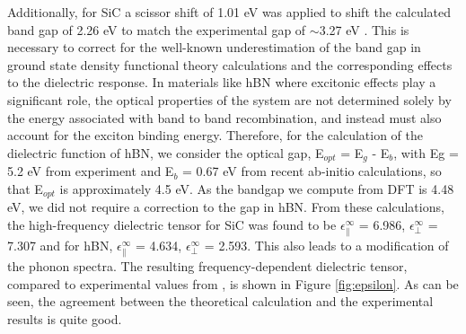 \documentclass[superscriptaddress,reprint,prb]{revtex4-1}
\begin{document}
Additionally, for SiC a scissor shift of 1.01 eV was applied to shift the calculated band gap of 2.26 eV to match the experimental gap of $\sim$3.27 eV \cite{band_gap_expt1,band_gap_expt2}. This is necessary to correct for the well-known underestimation of the band gap in ground state density functional theory calculations and the corresponding effects to the dielectric response. In materials like hBN where excitonic effects play a significant role, the optical properties of the system are not determined solely by the energy associated with band to band recombination, and instead must also account for the exciton binding energy\cite{robert2016excitonic}. 
Therefore, for the calculation of the dielectric function of hBN, we consider the optical gap, E$_{opt}$ = E$_g$ - E$_{b}$, with Eg = 5.2 eV from experiment\cite{levinshtein2001properties} and E$_{b}$ = 0.67 eV from recent ab-initio calculations\cite{attaccalite2018two}, so that E$_{opt}$ is approximately 4.5 eV. As the bandgap we compute from DFT is 4.48 eV, we did not require a correction to the gap in hBN.
From these calculations, the high-frequency dielectric tensor for SiC was found to be $\epsilon^{\infty}_{\parallel}$ = 6.986, $\epsilon^{\infty}_{\perp}$ = 7.307 and for hBN, $\epsilon^{\infty}_{\parallel}$ = 4.634, $\epsilon^{\infty}_{\perp}$ = 2.593.  This also leads to a modification of the phonon spectra. %
The resulting frequency-dependent dielectric tensor, compared to experimental values from \cite{tiwald1999carrier,caldwell2014sub}, is shown in Figure \ref{fig:epsilon}. As can be seen, the agreement between the theoretical calculation and the experimental results is quite good. 
\end{document}

